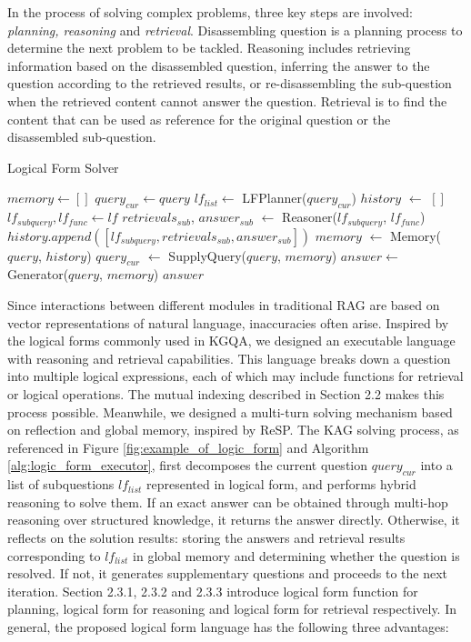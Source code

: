 \documentclass{article}
\begin{document}
In the process of solving complex problems, three key steps are involved: \textit{planning, reasoning} and \textit{retrieval}. Disassembling question is a planning process to determine the next problem to be tackled. Reasoning includes retrieving information based on the disassembled question, inferring the answer to the question according to the retrieved results, or re-disassembling the sub-question when the retrieved content cannot answer the question. Retrieval is to find the content that can be used as reference for the original question or the disassembled sub-question. 
\begin{algorithm}[htbp]
\caption{Logical Form Solver}
\begin{algorithmic}[1]
\State $memory \gets []$
\State $query_{cur} \gets query$ 
    \State $lf_{list} \gets$ LFPlanner($query_{cur}$)
    \State $history$ $\gets$ $[]$
        \State $lf_{subquery}, lf_{func} \gets lf$
        \State $retrievals_{sub}$, $answer_{sub}$ $\gets$ Reasoner($lf_{subquery}$, $lf_{func}$)
        \State $history.append([lf_{subquery}, retrievals_{sub}, answer_{sub}])$
    \EndFor
    \State $memory$ $\gets$ Memory($query$, $history$)
        \State $query_{cur}$ $\gets$ SupplyQuery($query$, $memory$)
    \EndIf
\EndFor
\State $answer \gets$ Generator($query$, $memory$)
\State \Return $answer$
\label{alg:logic_form_executor}
\end{algorithmic}
\end{algorithm}
Since interactions between different modules in traditional RAG are based on vector representations of natural language, inaccuracies often arise. Inspired by the logical forms commonly used in KGQA, we designed an executable language with reasoning and retrieval capabilities. This language breaks down a question into multiple logical expressions, each of which may include functions for retrieval or logical operations. The mutual indexing described in Section 2.2 makes this process possible. Meanwhile, we designed a multi-turn solving mechanism based on reflection and global memory, inspired by ReSP\cite{jiang2024retrieve}. The KAG solving process, as referenced in Figure \ref{fig:example_of_logic_form} and Algorithm \ref{alg:logic_form_executor}, first decomposes the current question $query_{cur}$ into a list of subquestions $lf_{list}$ represented in logical form, and performs hybrid reasoning to solve them. If an exact answer can be obtained through multi-hop reasoning over structured knowledge, it returns the answer directly. Otherwise, it reflects on the solution results: storing the answers and retrieval results corresponding to $lf_{list}$ in global memory and determining whether the question is resolved. If not, it generates supplementary questions and proceeds to the next iteration. Section 2.3.1, 2.3.2 and 2.3.3 introduce logical form function for planning, logical form for reasoning and logical form for retrieval respectively. In general, the proposed logical form language has the following three advantages:
\end{document}
